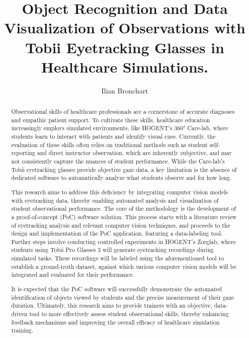 \documentclass[english]{hogent-article}
\title{Object Recognition and Data Visualization of Observations with Tobii Eyetracking Glasses in Healthcare Simulations.}
\author{Ilian Bronchart}
\begin{document}
\begin{abstract}
Observational skills of healthcare professionals are a cornerstone of accurate diagnoses and empathic patient support. 
To cultivate these skills, healthcare education increasingly employs simulated environments, 
like HOGENT's 360° Care-lab, where students learn to interact with patients and identify visual cues. 
Currently, the evaluation of these skills often relies on traditional methods such as student 
self-reporting and direct instructor observation, which are inherently subjective, and may not 
consistently capture the nuances of student performance. 
While the Care-lab's Tobii eyetracking glasses provide objective gaze data, a key limitation is the absence 
of dedicated software to automatically analyze what students observe and for how long.

This research aims to address this deficiency by integrating computer vision models with eyetracking data, 
thereby enabling automated analysis and visualization of student observational performance. 
The core of the methodology is the development of a proof-of-concept (PoC) software solution. 
This process starts with a literature review of eyetracking analysis and relevant computer vision techniques, 
and proceeds to the design and implementation of the PoC application, featuring a data-labeling tool. 
Further steps involve conducting controlled experiments in HOGENT's Zorglab, 
where students using Tobii Pro Glasses 3 will generate eyetracking recordings during simulated tasks. 
These recordings will be labeled using the aforementioned tool to establish a ground-truth dataset, 
against which various computer vision models will be integrated and evaluated for their 
performance.

It is expected that the PoC software will successfully demonstrate the automated identification 
of objects viewed by students and the precise measurement of their gaze duration. 
Ultimately, this research aims to provide trainers with an objective, data-driven tool to more effectively assess 
student observational skills, thereby enhancing feedback mechanisms and improving the overall efficacy of healthcare simulation training.
\end{abstract}

\tableofcontents

\bigskip

%
%
%
%
\end{document}
